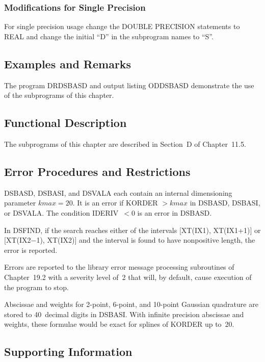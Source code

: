 \documentclass[twoside]{MATH77}
\begin{document}
\subsubsection{Modifications for Single Precision}

For single precision usage change the DOUBLE PRECISION statements to REAL
and change the initial ``D'' in the subprogram names to ``S''.

\subsection{Examples and Remarks}

The program DRDSBASD and output listing ODDSBASD demonstrate the use of the
subprograms of this chapter.

\subsection{Functional Description}

The subprograms of this chapter are described in Section~D of Chapter~11.5.




\subsection{Error Procedures and Restrictions}

DSBASD, DSBASI, and DSVALA each contain an internal dimensioning parameter
$kmax = 20$. It is an error if KORDER $> kmax$ in DSBASD, DSBASI, or DSVALA.
The condition IDERIV\ $< 0$ is an error in DSBASD.

In DSFIND, if the search reaches either of the intervals [XT(IX1),
XT(IX1+1)] or [XT(IX2$-$1), XT(IX2)] and the interval is found to have
nonpositive length, the error is reported.

Errors are reported to the library error message processing subroutines
of Chapter~19.2 with a severity level of~2 that will, by default, cause
execution of the program to stop.

Abscissae and weights for 2-point, 6-point, and 10-point Gaussian quadrature
are stored to 40~decimal digits in DSBASI. With infinite precision abscissae
and weights, these formulae would be exact for splines of KORDER up to~20.

\subsection{Supporting Information}
\end{document}
